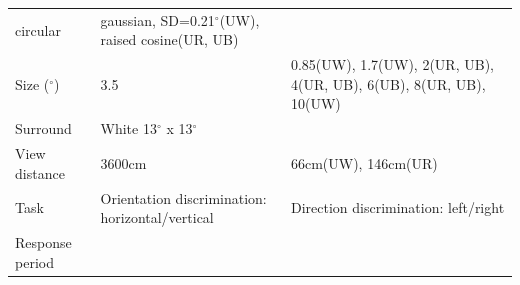 \documentclass[]{article}
\begin{document}
\begin{longtable}[]{@{}lll@{}}
\begin{minipage}[t]{0.29\columnwidth}
circular\strut
\end{minipage} & \begin{minipage}[t]{0.26\columnwidth}\raggedright
gaussian, SD=0.21\(^{\circ}\)(UW), raised cosine(UR, UB)\strut
\end{minipage}\tabularnewline
\begin{minipage}[t]{0.36\columnwidth}\raggedright
Size (\(^{\circ}\))\strut
\end{minipage} & \begin{minipage}[t]{0.29\columnwidth}\raggedright
3.5\strut
\end{minipage} & \begin{minipage}[t]{0.26\columnwidth}\raggedright
0.85(UW), 1.7(UW), 2(UR, UB), 4(UR, UB), 6(UB), 8(UR, UB), 10(UW)\strut
\end{minipage}\tabularnewline
\begin{minipage}[t]{0.36\columnwidth}\raggedright
Surround\strut
\end{minipage} & \begin{minipage}[t]{0.29\columnwidth}\raggedright
White 13\(^{\circ}\) x 13\(^{\circ}\)\strut
\end{minipage} & \begin{minipage}[t]{0.26\columnwidth}\raggedright
\strut
\end{minipage}\tabularnewline
\begin{minipage}[t]{0.36\columnwidth}\raggedright
View distance\strut
\end{minipage} & \begin{minipage}[t]{0.29\columnwidth}\raggedright
3600cm\strut
\end{minipage} & \begin{minipage}[t]{0.26\columnwidth}\raggedright
66cm(UW), 146cm(UR)\strut
\end{minipage}\tabularnewline
\begin{minipage}[t]{0.36\columnwidth}\raggedright
Task\strut
\end{minipage} & \begin{minipage}[t]{0.29\columnwidth}\raggedright
Orientation discrimination: horizontal/vertical\strut
\end{minipage} & \begin{minipage}[t]{0.26\columnwidth}\raggedright
Direction discrimination: left/right\strut
\end{minipage}\tabularnewline
\begin{minipage}[t]{0.36\columnwidth}\raggedright
Response period\strut
\end{minipage} & \begin{minipage}[t]{0.29\columnwidth}\raggedright

\end{minipage}
\end{longtable}
\end{document}
